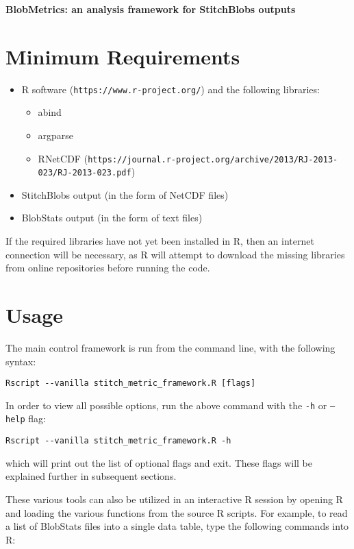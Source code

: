\documentclass{article}
\begin{document}
{\Huge \textbf{BlobMetrics: an analysis framework for StitchBlobs outputs}}
\tableofcontents

\pagebreak

\section{Minimum Requirements}
\begin{itemize}
\item R software (\texttt{https://www.r-project.org/}) and the following libraries:
\begin{itemize}
\item abind
\item argparse
\item RNetCDF (\texttt{https://journal.r-project.org/archive/2013/RJ-2013-023/RJ-2013-023.pdf})
\end{itemize}
\item StitchBlobs output (in the form of NetCDF files)
\item BlobStats output (in the form of text files)
\end{itemize}

If the required libraries have not yet been installed in R, then an internet connection will be necessary, as R will attempt to download the missing libraries from online repositories before running the code.

\section{Usage}
The main control framework is run from the command line, with the following syntax:
\begin{verbatim}
Rscript --vanilla stitch_metric_framework.R [flags]
\end{verbatim}

In order to view all possible options, run the above command with the \texttt{-h} or \texttt{--help} flag:
\begin{verbatim}
Rscript --vanilla stitch_metric_framework.R -h
\end{verbatim}

which will print out the list of optional flags and exit. These flags will be explained further in subsequent sections.

These various tools can also be utilized in an interactive R session by opening R and loading the various functions from the source R scripts. For example, to read a list of BlobStats files into a single data table, type the following commands into R:
\end{document}
